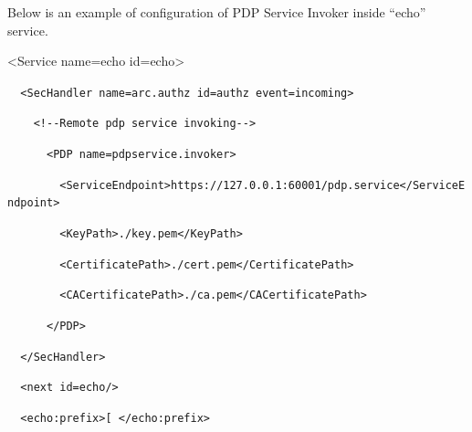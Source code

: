 \documentclass{article}
\begin{document}
{\upshape\color{black}
Below is an example of configuration of PDP Service Invoker inside
{\textquotedblleft}echo{\textquotedblright} service.}

{\ttfamily\color{black}
{\textless}Service name={\textquotedbl}echo{\textquotedbl}
id={\textquotedbl}echo{\textquotedbl}{\textgreater}}

{\upshape\color{black}
\foreignlanguage{spanish}{\texttt{\ \ }}\texttt{{\textless}SecHandler
name={\textquotedbl}arc.authz{\textquotedbl}
id={\textquotedbl}authz{\textquotedbl}
event={\textquotedbl}incoming{\textquotedbl}{\textgreater}}}

{\upshape\color{black}
\texttt{\ \ \ \ {\textless}!-{}-Remote pdp service
invoking-{}-{\textgreater}}}

{\upshape\color{black}
\texttt{\ \ \ \ \ \ {\textless}PDP
name={\textquotedbl}pdpservice.invoker{\textquotedbl}{\textgreater}}}

{\upshape\color{black}
\texttt{\ \ \ \ \ \ \ \ {\textless}ServiceEndpoint{\textgreater}https://127.0.0.1:60001/pdp.service{\textless}/ServiceEndpoint{\textgreater}}}

{\upshape\color{black}
\texttt{\ \ \ \ \ \ \ \ {\textless}KeyPath{\textgreater}./key.pem{\textless}/KeyPath{\textgreater}}}

{\upshape\color{black}
\texttt{\ \ \ \ \ \ \ \ {\textless}CertificatePath{\textgreater}./cert.pem{\textless}/CertificatePath{\textgreater}}}

{\upshape\color{black}
\texttt{\ \ \ \ \ \ \ \ {\textless}CACertificatePath{\textgreater}./ca.pem{\textless}/CACertificatePath{\textgreater}}}

{\upshape\color{black}
\texttt{\ \ \ \ \ \ {\textless}/PDP{\textgreater}}}

{\upshape\color{black}
\texttt{\ \ }\foreignlanguage{spanish}{\texttt{{\textless}/SecHandler{\textgreater}}}}

{\upshape\color{black}
\foreignlanguage{spanish}{\texttt{\ \ }}\foreignlanguage{spanish}{\texttt{{\textless}next
id={\textquotedbl}echo{\textquotedbl}/{\textgreater}}}}

{\upshape\color{black}
\foreignlanguage{spanish}{\texttt{\ \ }}\foreignlanguage{spanish}{\texttt{{\textless}echo:prefix{\textgreater}[
{\textless}/echo:prefix{\textgreater}}}}
\end{document}
